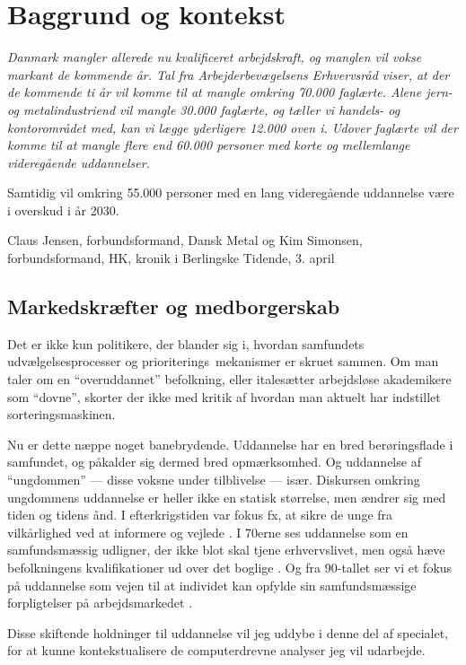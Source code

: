 \part{Baggrund og kontekst}\label{part:baggrund}
\epigraph{\itshape
Danmark mangler allerede nu kvalificeret arbejdskraft, og manglen vil vokse markant de kommende år. Tal fra Arbejderbevægelsens Erhvervsråd viser, at der de kommende ti år vil komme til at mangle omkring 70.000 faglærte. Alene jern- og metalindustriend vil mangle 30.000 faglærte, og tæller vi handels- og kontorområdet med, kan vi lægge yderligere 12.000 oven i. Udover faglærte vil der komme til at mangle flere end 60.000 personer med korte og mellemlange videregående uddannelser.

Samtidig vil omkring 55.000 personer med en lang videregående uddannelse være i overskud i år 2030.
}
{Claus Jensen, forbundsformand, Dansk Metal og Kim Simonsen, forbundsformand, HK, kronik i Berlingske Tidende, 3. april \citeyear{simonsenLadOsGore2016}}

\chapter{Markedskræfter og medborgerskab}\label{chap:marked}

Det er ikke kun politikere, der blander sig i, hvordan samfundets udvælgelsesprocesser og prioriterings\ mekanismer er skruet sammen.
Om man taler om en “overuddannet” befolkning, eller italesætter arbejdsløse akademikere som “dovne”, skorter der ikke med kritik af hvordan man aktuelt har indstillet sorteringsmaskinen.

Nu er dette næppe noget banebrydende.
Uddannelse har en bred berøringsflade i samfundet, og påkalder sig dermed bred opmærksomhed.
Og uddannelse af “ungdommen” — disse voksne under tilblivelse — især.
Diskursen omkring ungdommens uddannelse er heller ikke en statisk størrelse, men ændrer sig med tiden og tidens ånd.
I efterkrigstiden var fokus fx, at sikre de unge fra vilkårlighed ved at informere og vejlede \autocite[s 17ff]{juulDiskurserOmUngdom2013}.
I 70erne ses uddannelse som en samfundsmæssig udligner, der ikke blot skal tjene erhvervslivet, men også hæve befolkningens kvalifikationer ud over det boglige \autocite[s 15ff]{juulDiskurserOmUngdom2013}.
Og fra 90-tallet ser vi et fokus på uddannelse som vejen til at individet kan opfylde sin samfundsmæssige forpligtelser på arbejdsmarkedet \autocite[s. 18]{juulDiskurserOmUngdom2013}.

Disse skiftende holdninger til uddannelse vil jeg uddybe i denne del af specialet, for at kunne kontekstualisere de computerdrevne analyser jeg vil udarbejde.

